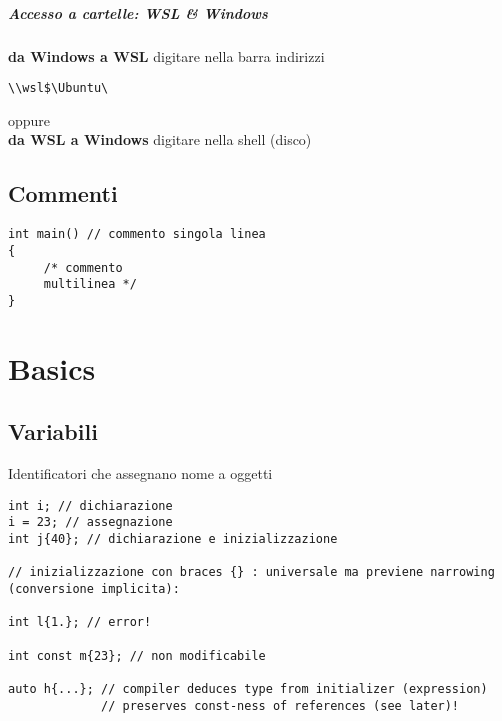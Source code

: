 \documentclass[10pt, oneside]{Book}
\begin{document}
\paragraph{Accesso a cartelle: WSL \& Windows} \textbf{da Windows a WSL} digitare nella barra indirizzi \begin{verbatim}
\\wsl$\Ubuntu\
\end{verbatim}
oppure  
\\\textbf{da WSL a Windows} digitare nella shell \boxed{\texttt{cd /mnt/C/}} (disco)

\section{Commenti}
\begin{verbatim}
int main() // commento singola linea
{ 
     /* commento
     multilinea */
}
\end{verbatim}

\chapter{Basics}

\section{Variabili}
Identificatori che assegnano nome a oggetti
\\\begin{verbatim}
int i; // dichiarazione
i = 23; // assegnazione
int j{40}; // dichiarazione e inizializzazione

// inizializzazione con braces {} : universale ma previene narrowing (conversione implicita):

int l{1.}; // error!

int const m{23}; // non modificabile

auto h{...}; // compiler deduces type from initializer (expression)
             // preserves const-ness of references (see later)!
\end{verbatim}
\end{document}
